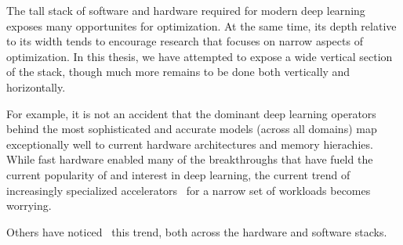 The tall stack of software and hardware required for modern deep learning exposes many opportunites for optimization.
At the same time, its depth relative to its width tends to encourage research that focuses on narrow aspects of optimization.
In this thesis, we have attempted to expose a wide vertical section of the stack, though much more remains to be done both vertically and horizontally.

For example, it is not an accident that the dominant deep learning operators behind the most sophisticated and accurate models (across all domains) map exceptionally well to current hardware architectures and memory hierachies.
While fast hardware enabled many of the breakthroughs that have fueld the current popularity of and interest in deep learning, the current trend of increasingly specialized accelerators~\cite{chen2014diannao, chen2016diannao, jouppi2017datacenter, abts2020think} for a narrow set of workloads becomes worrying.


Others have noticed~\cite{barham2019machine} this trend, both across the hardware and software stacks.



